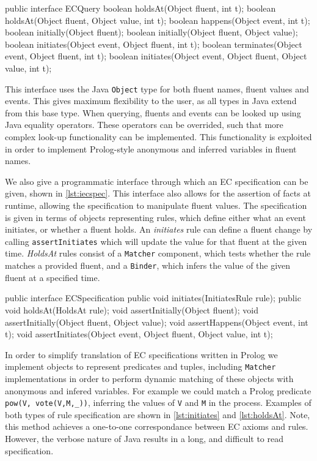 \begin{java}[label=lst:iecquery,caption=Java interface for deductive queries on an EC Specification]
public interface ECQuery {
	boolean holdsAt(Object fluent, int t);
	boolean holdsAt(Object fluent, Object value, int t);
	boolean happens(Object event, int t);
	boolean initially(Object fluent);
	boolean initially(Object fluent, Object value);
	boolean initiates(Object event, Object fluent, int t);
	boolean terminates(Object event, Object fluent, int t);
	boolean initiates(Object event, Object fluent, Object value, int t);
}
\end{java}

This interface uses the Java \texttt{Object} type for both fluent names,
fluent values and events. This gives maximum flexibility to the user, as all
types in Java extend from this base type. When querying, fluents and events
can be looked up using Java equality operators. These operators can be
overrided, such that more complex look-up functionality can be implemented.
This functionality is exploited in order to implement Prolog-style anonymous
and inferred variables in fluent names.

We also give a programmatic interface through which an \ac{EC} specification
can be given, shown in \autoref{lst:iecspec}. This interface also allows for
the assertion of facts at runtime, allowing the specification to manipulate
fluent values. The specification is given in terms of objects representing
rules, which define either what an event initiates, or whether a fluent holds.
An \emph{initiates} rule can define a fluent change by calling
\texttt{assertInitiates} which will update the value for that fluent at the
given time. \emph{HoldsAt} rules consist of a \texttt{Matcher} component, which
tests whether the rule matches a provided fluent, and a \texttt{Binder}, which
infers the value of the given fluent at a specified time.

\begin{java}[label=lst:iecspec,caption=Java interface for declaration of an EC specification]
public interface ECSpecification {
	public void initiates(InitiatesRule rule);
	public void holdsAt(HoldsAt rule);
	void assertInitially(Object fluent);
	void assertInitially(Object fluent, Object value);
	void assertHappens(Object event, int t);
	void assertInitiates(Object event, Object fluent, Object value, int t);
}
\end{java}

In order to simplify translation of \ac{EC} specifications written in Prolog
we implement objects to represent predicates and tuples, including
\texttt{Matcher} implementations in order to perform dynamic matching of these
objects with anonymous and infered variables. For example we could match a
Prolog predicate \texttt{pow(V, vote(V,M,\_))}, inferring the values of
\texttt{V} and \texttt{M} in the process. Examples of both types of rule
specification are shown in \autoref{lst:initiates} and \autoref{lst:holdsAt}.
Note, this method achieves a one-to-one correspondance between \ac{EC} axioms
and rules. However, the verbose nature of Java results in a long, and
difficult to read specification.

